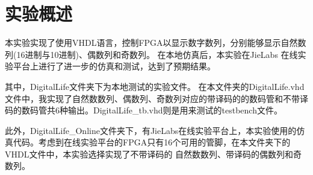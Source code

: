 \documentclass[UTF8]{article}
\begin{document}







\newpage


\section{实验概述}
\qquad 本实验实现了使用VHDL语言，控制FPGA以显示数字数列，分别能够显示自然数列(16进制与10进制)、偶数列和奇数列。
在本地仿真后，本实验在JieLabs 在线实验平台上进行了进一步的仿真和测试，达到了预期结果。


\qquad 其中，DigitalLife文件夹下为本地测试的实验文件。
在本文件夹的DigitalLife.vhd文件中，我实现了自然数数列、偶数列、奇数列对应的带译码的的数码管和不带译码的数码管共6种输出。DigitalLife\_tb.vhd则是用来测试的testbench文件。


\qquad 此外，DigitalLife\_Online文件夹下，有JieLabs在线实验平台上，本实验使用的仿真代码。考虑到在线实验平台的FPGA只有16个可用的管脚，在本文件夹下的VHDL文件中，本实验选择实现了不带译码的
自然数数列、带译码的偶数列和奇数列。
\end{document}
